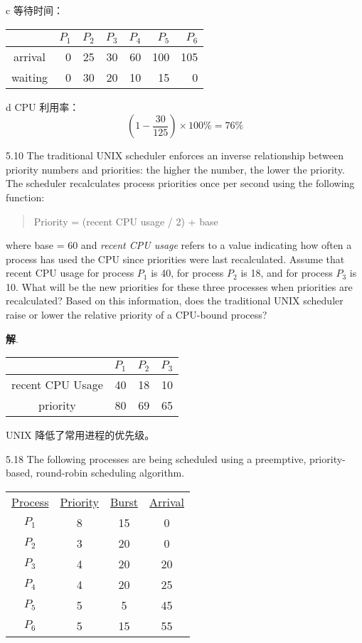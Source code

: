 \documentclass[12pt,a4paper]{article}
\newenvironment{problems}{\begin{list}{}{\renewcommand{\makelabel}[1]{\textbf{##1}\hfil}}}{\end{list}}
\newenvironment{steps}{\begin{list}{}{\renewcommand{\makelabel}[1]{##1.\hfil}}}{\end{list}}
\providecommand{\sol}{\textbf{解}.~}
\begin{document}
\begin{problems}
\begin{steps}
    \item[c] 等待时间：
     
    \begin{tabular}{c|rrrrrr}
         & $P_1$ & $P_2$ & $P_3$ & $P_4$ & $P_5$ & $P_6$ \\
        \hline
        arrival & 0 & 25 & 30 & 60 & 100 & 105 \\
        \rowcolor{green!20} waiting & 0 & 30 & 20 & 10 & 15 & 0 
    \end{tabular}

    \item[d] CPU 利用率：
    \begin{equation*}
        \left(1 - \frac{30}{125} \right)\times 100 \%=76\% 
    \end{equation*} 

\end{steps}

\item[5.10] The traditional UNIX scheduler enforces an inverse relationship between
priority numbers and priorities: the higher the number, the lower the
priority. The scheduler recalculates process priorities once per second
using the following function:
\begin{quotation}
    Priority = (recent CPU usage / 2) + base
\end{quotation}
where base = 60 and \emph{recent CPU usage} refers to a value indicating how
often a process has used the CPU since priorities were last recalculated.
Assume that recent CPU usage for process $P_1$ is 40, for process $P_2$ is 18,
and for process $P_3$ is 10. What will be the new priorities for these three
processes when priorities are recalculated? Based on this information,
does the traditional UNIX scheduler raise or lower the relative priority
of a CPU-bound process?

\sol 

\begin{tabular}{c|rrr}
     & $P_1$ & $P_2$ & $P_3$ \\
     \hline
    recent CPU Usage & 40 & 18 & 10 \\
    \rowcolor{green!20} priority & 80 & 69 & 65 
\end{tabular}

UNIX 降低了常用进程的优先级。

\item[5.18] The following processes are being scheduled using a preemptive,
priority-based, round-robin scheduling algorithm.

\begin{tabular}{cccc}
    \underline{Process} & \underline{Priority} & \underline{Burst} &  \underline{Arrival}\\
$P_1$ & 8 & 15& 0\\
$P_2$ & 3 & 20& 0\\
$P_3$ & 4 & 20& 20\\
$P_4$ & 4 & 20& 25\\
$P_5$ & 5 & 5 &45\\
$P_6$ & 5 & 15& 55
\end{tabular}


\end{problems}
\end{document}
